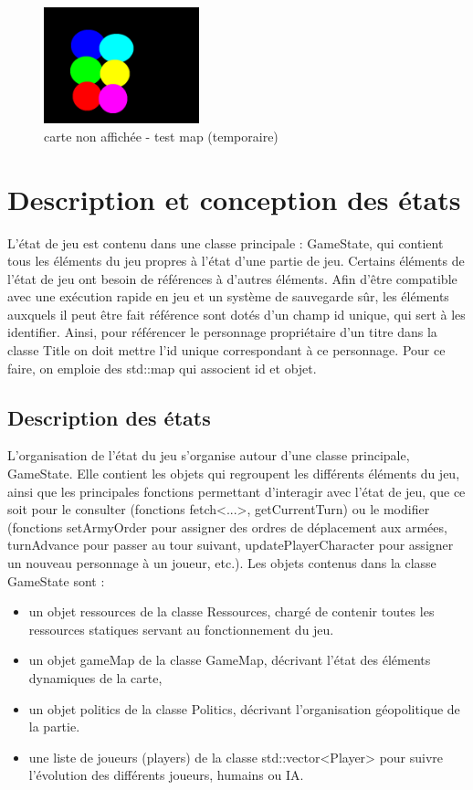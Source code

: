 \documentclass[a4paper,12pt]{article}
\begin{document}
\begin{figure}[hbtp]
\centering
\includegraphics[width=0.4\textwidth]{testMap.jpg}
\caption{carte non affichée - test map (temporaire)} 
\end{figure}

\clearpage
\section{Description et conception des états}

L'état de jeu est contenu dans une classe principale : GameState, qui contient tous les éléments du jeu propres à l'état d'une partie de jeu.
Certains éléments de l'état de jeu ont besoin de références à d'autres éléments. Afin d'être compatible avec une exécution rapide en jeu et un système de sauvegarde sûr, les éléments auxquels il peut être fait référence sont dotés d'un champ id unique, qui sert à les identifier. Ainsi, pour référencer le personnage propriétaire d'un titre dans la classe Title on doit mettre l'id unique correspondant à ce personnage. Pour ce faire, on emploie des std::map qui associent id et objet.

\subsection{Description des états}

L'organisation de l'état du jeu s'organise autour d'une classe principale, GameState. Elle contient les objets qui regroupent les différents éléments du jeu, ainsi que les principales fonctions permettant d'interagir avec l'état de jeu, que ce soit pour le consulter (fonctions fetch<...>, getCurrentTurn) ou le modifier (fonctions setArmyOrder pour assigner des ordres de déplacement aux armées, turnAdvance pour passer au tour suivant, updatePlayerCharacter pour assigner un nouveau personnage à un joueur, etc.).
Les objets contenus dans la classe GameState sont :\\

\begin{itemize}
\item un objet ressources de la classe Ressources, chargé de contenir toutes les ressources statiques servant au fonctionnement du jeu. 
\item un objet gameMap de la classe GameMap, décrivant l'état des éléments dynamiques de la carte, 
\item un objet politics de la classe Politics, décrivant l'organisation géopolitique de la partie. 
\item une liste de joueurs (players) de la classe std::vector<Player> pour suivre l'évolution des différents joueurs, humains ou IA.\\
\end{itemize}
\end{document}
